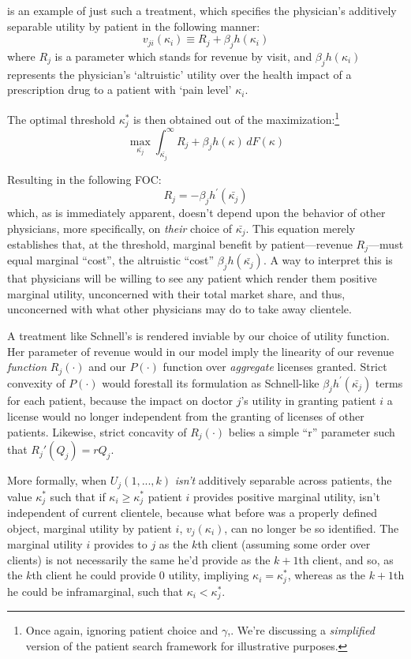 \documentclass[../main.tex]{subfiles}
\begin{document}
\cite{schnell2017physician} is an example of just such a treatment, which specifies the physician's additively separable utility by patient in the following manner:
\[
v_{ji}(\kappa_i) \equiv R_j + \beta_j h(\kappa_i)
\]
where $R_j$ is a parameter which stands for revenue by visit, and $\beta_j h(\kappa_i)$ represents the physician's `altruistic' utility over the health impact of a prescription drug to a patient with `pain level' $\kappa_i$.

The optimal threshold $\kappa_j^*$ is then obtained out of the maximization:\footnote{Once again, ignoring patient choice and $\gamma$,. We're discussing a \textit{simplified} version of the patient search framework for illustrative purposes.}
\[
\max_{\bar{\kappa_j}}\int_{\bar{\kappa_j}}^{\infty}  R_j + \beta_j h(\kappa) \, dF(\kappa)
\]

Resulting in the following FOC:
\[
R_j = - \beta_j h^{\prime}(\bar{\kappa_j})
\]
which, as is immediately apparent, doesn't depend upon the behavior of other physicians, more specifically, on \textit{their} choice of $\bar{\kappa_j}$. This equation merely establishes that, at the threshold, marginal benefit by patient—revenue $R_j$—must equal marginal ``cost'', the altruistic ``cost'' $\beta_j h(\bar{\kappa_j})$. A way to interpret this is that physicians will be willing to see any patient which render them positive marginal utility, unconcerned with their total market share, and thus, unconcerned with what other physicians may do to take away clientele.

A treatment like Schnell's is rendered inviable by our choice of utility function. Her parameter of revenue would in our model imply the linearity of our revenue \textit{function} $R_j(\cdot)$ and our $P(\cdot)$ function over \textit{aggregate} licenses granted. Strict convexity of $P(\cdot)$ would forestall its formulation as Schnell-like $\beta_j h^{\prime}(\bar{\kappa_j})$ terms for each patient, because the impact on doctor $j$'s utility in granting patient $i$ a license would no longer independent from the granting of licenses of other patients. Likewise, strict concavity of $R_j(\cdot)$ belies a simple ``r'' parameter such that $R_j'(Q_j) = r Q_j$.

More formally, when $U_j(1,...,k)$ \textit{isn't} additively separable across patients, the value $\kappa_j^*$ such that if $\kappa_i \geq \kappa_j^*$ patient $i$ provides positive marginal utility, isn’t independent of current clientele, because what before was a properly defined object, marginal utility by patient $i$, $v_j(\kappa_i)$, can no longer be so identified. The marginal utility $i$ provides to $j$ as the $k$th client (assuming some order over clients) is not necessarily the same he’d provide as the $k+1$th client, and so, as the $k$th client he could provide $0$ utility, impliying $\kappa_i = \kappa_j^*$, whereas as the $k + 1$th he could be inframarginal, such that $\kappa_i < \kappa_j^*$.
\end{document}
